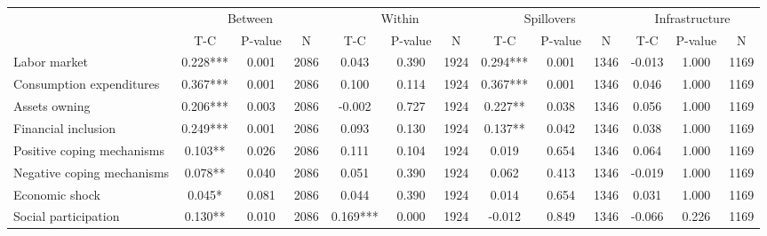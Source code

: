 
\begin{tabular}{l*{12}{c}}\hline&\multicolumn{3}{c}{Between}&\multicolumn{3}{c}{Within}&\multicolumn{3}{c}{Spillovers}&\multicolumn{3}{c}{Infrastructure} \\ \cmidrule(r){2-4}\cmidrule(l){5-7}\cmidrule(l){8-10}\cmidrule(l){9-13} & {T-C} & {P-value} & {N} & {T-C} & {P-value} & {N}  & {T-C} & {P-value} & {N} & {T-C} & {P-value} & {N} \\ \midrule

 Labor market &        0.228*** &        0.001 & 2086    &        0.043 &        0.390 & 1924    &        0.294*** &        0.001 & 1346 &       -0.013 &        1.000 & 1169 \\ 

 Consumption expenditures &        0.367*** &        0.001 & 2086    &        0.100 &        0.114 & 1924    &        0.367*** &        0.001 & 1346 &        0.046 &        1.000 & 1169 \\ 

 Assets owning &        0.206*** &        0.003 & 2086    &       -0.002 &        0.727 & 1924    &        0.227** &        0.038 & 1346 &        0.056 &        1.000 & 1169 \\ 

 Financial inclusion &        0.249*** &        0.001 & 2086    &        0.093 &        0.130 & 1924    &        0.137** &        0.042 & 1346 &        0.038 &        1.000 & 1169 \\ 

 Positive coping mechanisms &        0.103** &        0.026 & 2086    &        0.111 &        0.104 & 1924    &        0.019 &        0.654 & 1346 &        0.064 &        1.000 & 1169 \\ 

 Negative coping mechanisms &        0.078** &        0.040 & 2086    &        0.051 &        0.390 & 1924    &        0.062 &        0.413 & 1346 &       -0.019 &        1.000 & 1169 \\ 

 Economic shock &        0.045* &        0.081 & 2086    &        0.044 &        0.390 & 1924    &        0.014 &        0.654 & 1346 &        0.031 &        1.000 & 1169 \\ 

 Social participation &        0.130** &        0.010 & 2086    &        0.169*** &        0.000 & 1924    &       -0.012 &        0.849 & 1346 &       -0.066 &        0.226 & 1169 \\ 


\end{tabular}
